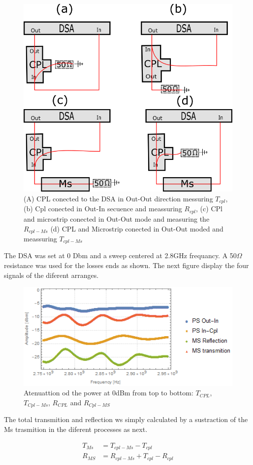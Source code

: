 \begin{figure}
	\centering
	\includegraphics[width=0.7\linewidth]{../figures/APD}
	\caption[diferent arranges of the CPL and MicroStrip conected to the DSA]{(A) CPL conected to the DSA in Out-Out direction messuring $T_{cpl}$, (b) Cpl conected in Out-In secuence and meassuring $R_{cpl}$, (c) CPl and microstrip conected in Out-Out mode and measuring the $R_{cpl-Ms}$ (d) CPL and Microstrip conected in Out-Out moded and meassuring $T_{cpl-Ms}$}
	\label{fig:apd}
\end{figure}

The DSA was set at 0 Dbm and a sweep centered at 2.8GHz frequancy. A 50$\Omega$ resistance was used for the losses ends as shown. The next figure display the four signals of the diferent arranges.
\begin{figure}
	\centering
	\includegraphics[width=0.7\linewidth]{../figures/microstrip}
	\caption{Atenuattion od the power at 0dBm from top to bottom: $T_{CPL}$,$T_{Cpl-Ms}$, $R_{CPL}$ and $R_{Cpl-MS}$}
	\label{fig:microstrip}
	\end{figure}

The total transmition and reflection ws simply calculated by a sustraction of the Ms trasmition in the diferent processes as next.

\begin{align}
T_{Ms}&=T_{cpl-Ms}-T_{cpl}\\
R_{MS}&=R_{cpl-Ms}+T_{cpl}-R_{cpl}
\end{align}



